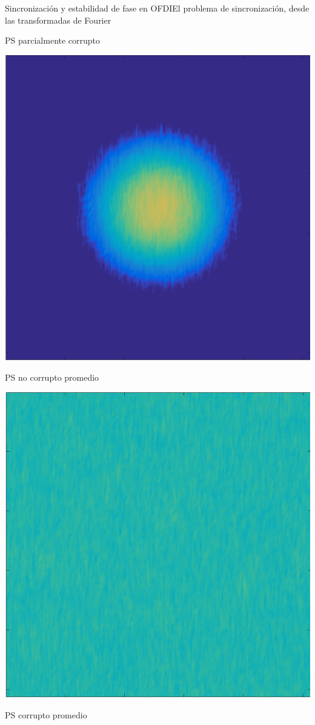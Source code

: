 \documentclass[fleqn,10pt]{beamer}
\begin{document}
\begin{frame}{Sincronización y estabilidad de fase en OFDI}{El problema de sincronización, desde las transformadas de Fourier}
\begin{minipage}{0.3\linewidth}
		PS parcialmente corrupto
	\end{minipage}
	\hfill
	\pause
	\begin{minipage}{0.3\linewidth}
		\centering
		\includegraphics[width=0.7\linewidth]{AAUgraphics/pt4/psf_mean}
		
		{\footnotesize PS no corrupto promedio}
		
		\includegraphics[width=0.7\linewidth]{AAUgraphics/pt4/psf_mean_corrupt}
		
		{\footnotesize PS corrupto promedio}
	\end{minipage}%
\end{frame}
\end{document}
